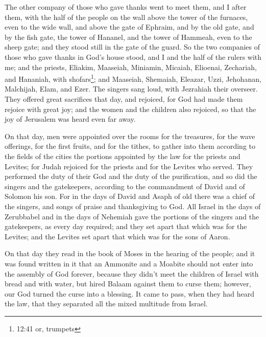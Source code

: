 \myverse{}The other company of those who gave thanks went to meet them,
and I after them, with the half of the people on the wall above the tower of the furnaces, even to the
wide wall,
\myverse{}and above the gate of Ephraim, and by the old gate, and by the fish gate,
the tower of Hananel, and the tower of Hammeah, even to the sheep gate; and they stood still in the gate
of the guard.
\myverse{}So the two companies of those who gave thanks in God’s house stood, and I
and the half of the rulers with me;
\myverse{}and the priests, Eliakim, Maaseiah, Miniamin, Micaiah, Elioenai, Zechariah,
and Hananiah, with shofars\footnote{12:41 or, trumpets};
\myverse{}and Maaseiah, Shemaiah, Eleazar, Uzzi, Jehohanan, Malchijah, Elam, and Ezer.
The singers sang loud, with Jezrahiah their overseer.
\myverse{}They offered great sacrifices that day, and rejoiced, for God had made them
rejoice with great joy; and the women and the children also rejoiced, so that the joy of Jerusalem was
heard even far away.

\myverse{}On that day, men were appointed over the rooms for the treasures,
for the wave offerings, for the first fruits, and for the tithes, to gather into them according to the
fields of the cities the portions appointed by the law for the priests and Levites; for Judah rejoiced
for the priests and for the Levites who served.
\myverse{}They performed the duty of their God and the duty of the purification, and
so did the singers and the gatekeepers, according to the commandment of David and of Solomon his son.
\myverse{}For in the days of David and Asaph of old there was a chief of the singers,
and songs of praise and thanksgiving to God.
\myverse{}All Israel in the days of Zerubbabel and in the days of Nehemiah gave the
portions of the singers and the gatekeepers, as every day required; and they set apart that which was
for the Levites; and the Levites set apart that which was for the sons of Aaron.


\mychapter{} \myverse*{}On that day they read in the book of Moses in the hearing of the
people; and it was found written in it that an Ammonite and a Moabite should not enter into the assembly
of God forever,
\myverse{}because they didn’t meet the children of Israel with bread and with water,
but hired Balaam against them to curse them; however, our God turned the curse into a blessing.
\myverse{}It came to pass, when they had heard the law, that they separated all the mixed
multitude from Israel.

